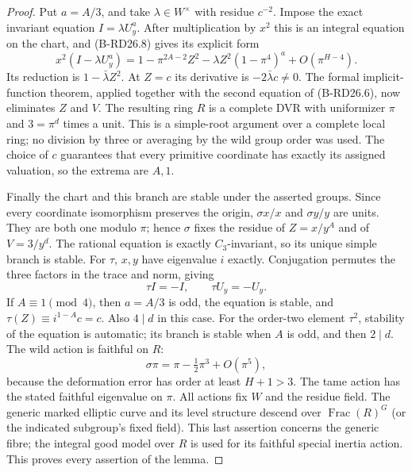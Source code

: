 \begin{proof}
Put $a=A/3$, and take $\lambda\in W^\times$ with residue $c^{-2}$.
Impose the exact invariant equation $I=\lambda U_y^a$.
After multiplication by $x^2$ this is an integral equation on
the chart, and (B-RD26.8) gives its explicit form
\[
 x^2(I-\lambda U_y^a)
   =1-\pi^{2A-2}Z^2-\lambda Z^2(1-\pi^4)^a
                                  +O(\pi^{H-4}).       \tag{B-RD26.9}
\]
Its reduction is $1-\bar\lambda Z^2$. At $Z=c$ its derivative
is $-2\bar\lambda c\ne0$. The formal implicit-function theorem,
applied together with the second equation of (B-RD26.6), now
eliminates $Z$ and $V$. The resulting ring $R$ is a complete DVR
with uniformizer $\pi$ and $3=\pi^d$ times a unit. This is a
simple-root argument over a complete local ring; no division by
three or averaging by the wild group order was used.
The choice of $c$ guarantees that every primitive coordinate has
exactly its assigned valuation, so the extrema are $A,1$.

Finally the chart and this branch are stable under the asserted
groups. Since every coordinate isomorphism preserves the
origin, $\sigma x/x$ and $\sigma y/y$ are units. They are both
one modulo $\pi$; hence $\sigma$ fixes the residue of $Z=x/y^A$
and of $V=3/y^d$. The rational equation is exactly
$C_3$-invariant, so its unique simple branch is stable.
For $\tau$, $x,y$ have eigenvalue $i$ exactly. Conjugation
permutes the three factors in the trace and norm, giving
\[
             \tau I=-I,\qquad \tau U_y=-U_y.
\]
If $A\equiv1\pmod4$, then $a=A/3$ is odd, the equation is
stable, and $\tau(Z)\equiv i^{1-A}c=c$. Also $4\mid d$ in
this case. For the order-two element $\tau^2$, stability of the
equation is automatic; its branch is stable when $A$ is odd,
and then $2\mid d$. The wild action is faithful on $R$:
\[
                 \sigma\pi=\pi-\tfrac12\pi^3
                                      +O(\pi^5),
\]
because the deformation error has order at least $H+1>3$.
The tame action has the stated faithful eigenvalue on $\pi$.
All actions fix $W$ and the residue field. The generic marked
elliptic curve and its level structure descend over
$\operatorname{Frac}(R)^G$ (or the indicated subgroup's fixed
field). This last assertion concerns the generic fibre; the
integral good model over $R$ is used for its faithful special
inertia action. This proves every assertion of the lemma.
\end{proof}

